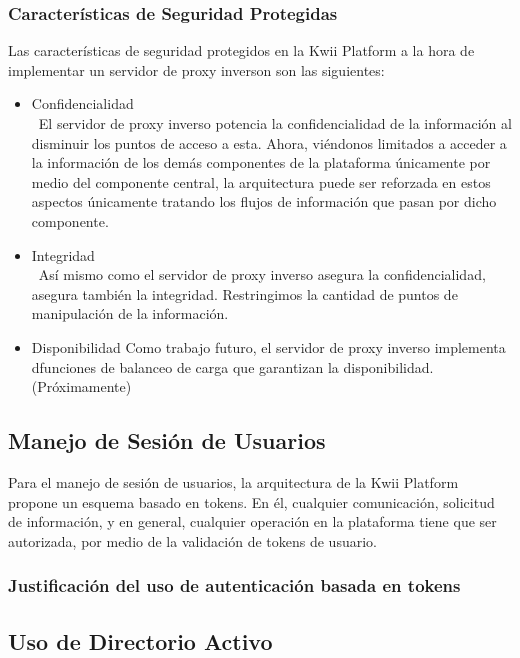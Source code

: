 \subsubsection{Características de Seguridad Protegidas}
Las características de seguridad protegidos en la Kwii Platform a la hora de implementar un servidor de proxy inverson son las siguientes:
\begin{itemize}
    \item Confidencialidad\\\
    El servidor de proxy inverso potencia la confidencialidad de la información al disminuir los puntos de acceso a esta. Ahora, viéndonos limitados a acceder a la información de los demás componentes de la plataforma únicamente por medio del componente central, la arquitectura puede ser reforzada en estos aspectos únicamente tratando los flujos de información que pasan por dicho componente.
    \item Integridad\\\
    Así mismo como el servidor de proxy inverso asegura la confidencialidad, asegura también la integridad. Restringimos la cantidad de puntos de manipulación de la información.
    \item Disponibilidad
    Como trabajo futuro, el servidor de proxy inverso implementa dfunciones de balanceo de carga que garantizan la disponibilidad. (Próximamente)
\end{itemize}

\subsection{Manejo de Sesión de Usuarios}

Para el manejo de sesión de usuarios, la arquitectura de la Kwii Platform propone un esquema basado en tokens. En él, cualquier comunicación, solicitud de información, y en general, cualquier operación en la plataforma tiene que ser autorizada, por medio de la validación de tokens de usuario.

\subsubsection{Justificación del uso de autenticación basada en tokens}

\subsection{Uso de Directorio Activo}